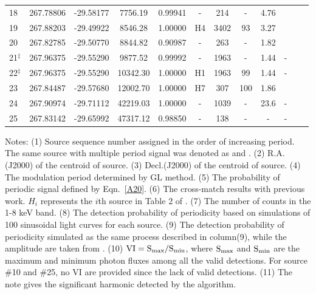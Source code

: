 \documentclass[fleqn,usenatbib]{mnras}
\begin{document}
\begin{table}
\begin{threeparttable}
\begin{tabular}{lccccccccccc}
\\
18 & 267.78806 &	 -29.58177 & 7756.19 & 0.99941 &-& 214  &-& 4.76 &\text{Second}
\\
19 & 267.88203 &	 -29.49922 & 8546.28 & 1.00000 &H4 & 3402   & 93 & 3.27 & \text{Second}
\\
20 & 267.82785 &	 -29.50770 & 8844.82 & 0.90987 &-& 263
	&-& 1.82 & \text{Second}
\\
21$^\ddag$ & 267.96375 & -29.55290 & 9877.52 & 0.99992 & - & 1963  &-& 1.44&- 
\\
22$^\ddag$ & 267.96375 & -29.55290 & 10342.30 & 1.00000 & H1 & 1963  & 99 & 1.44 &-
\\
23 & 267.84487 &	 -29.57680 & 12002.70 & 1.00000 & H7 & 307  & 100   & 1.86 & \text{Second}
\\
24 & 267.90974 &	-29.71112 & 42219.03 & 1.00000 & - &1039 &-&23.6&-
\\
25 & 267.83142 &	 -29.65992 & 47317.12 & 0.98850 &- & 138  &-&- &-
\\
\hline
\end{tabular}
\begin{tablenotes}
      \small
      \item 
      Notes:
      (1) Source sequence number assigned in the order of increasing period. The same source with multiple period signal was denoted as \dag and \ddag. 
(2) R.A.(J2000) of the centroid of source. 
(3) Decl.(J2000) of the centroid of source. 
(4) The modulation period determined by GL method.
(5) The probability of periodic signal defined by Eqn.~\ref{A20}. 
(6) The cross-match results with previous work. $H_{i}$ represents the $i$th source in Table 2 of \cite{2012ApJ...746..165H}. 
(7) The number of counts in the 1-8 keV band. 
(8) The detection probability of periodicity based on simulations of 100 sinusoidal light curves for each source.
(9) The detection probability of periodicity simulated as the same process described in column(9), while the amplitude are taken from \cite{2012ApJ...746..165H}.
(10) $\rm VI=S_{max}/S_{min}$, where $\rm S_{max}$ and $\rm S_{min}$ are the maximum and minimum photon fluxes among all the valid detections. For source \#10 and \#25, no VI are provided since the lack of valid detections.
(11) The note gives the significant harmonic detected by the algorithm.
    \end{tablenotes}
\end{threeparttable}
\end{table}
\end{document}
